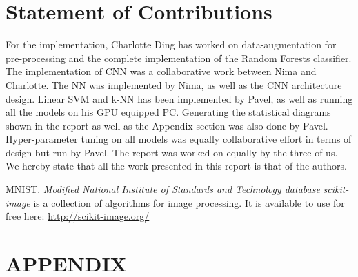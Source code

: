 \documentclass[twoside,twocolumn]{article}
\begin{document}

\section{Statement of Contributions}
For the implementation, Charlotte Ding has worked on data-augmentation for pre-processing and the complete implementation of the Random Forests classifier. The implementation of CNN was a collaborative work between Nima and Charlotte. The NN was implemented by Nima, as well as the CNN architecture design. Linear SVM and k-NN has been implemented by Pavel, as well as running all the models on his GPU equipped PC. Generating the statistical diagrams shown in the report as well as the Appendix section was also done by Pavel. Hyper-parameter tuning on all models was equally collaborative effort in terms of design but run by Pavel. The report was worked on equally by the three of us. \\
We hereby state that all the work presented in this report is that of the authors.


\begin{thebibliography}{99} %

MNIST. \textit{Modified National Institute of Standards and Technology database}
\textit{scikit-image} is a collection of algorithms for image processing. It is available to use for free here: \url{http://scikit-image.org/}

\end{thebibliography}
\newpage
\section{APPENDIX}

\end{document}
